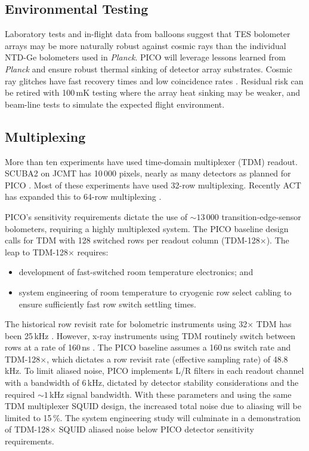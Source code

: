 
\subsection{Environmental Testing}
\label{sec:env_testing}

Laboratory tests and in-flight data from balloons suggest that TES
bolometer arrays may be more naturally robust against cosmic rays than
the individual NTD-Ge bolometers used in \textit{Planck}. PICO will leverage lessons
learned from \textit{Planck} and ensure robust thermal sinking of
detector array substrates. Cosmic ray
glitches have fast recovery times and low coincidence rates
\citep{SPIDER2018,Filippini_inprep}. Residual risk can be retired with 100\,mK
testing where the array heat sinking may be weaker, and beam-line
tests to simulate the expected flight environment.

\subsection{Multiplexing}
\label{sec:multiplexing}

More than ten experiments have used time-domain multiplexer (TDM)
readout. SCUBA2 on JCMT has 10\,000 pixels, nearly as many detectors
as planned for PICO \citep{Holland2013}. Most of these experiments
have used 32-row multiplexing. Recently ACT has expanded this to
64-row multiplexing \citep{Henderson2016}.

PICO's sensitivity requirements dictate the use of $\sim 13\,000$
transition-edge-sensor bolometers, requiring a highly multiplexed
system.  The PICO baseline design calls for TDM
with 128 switched rows per readout column (TDM-128$\times$). The leap
to TDM-128$\times$ requires:
\begin{itemize}
\item development of fast-switched room temperature electronics; and
\item system engineering of room temperature to cryogenic row select cabling to ensure sufficiently fast row switch settling times.
\end{itemize}

The historical row revisit rate for bolometric instruments using
32$\times$ TDM has been 25\,kHz \cite[e.g.,][]{BICEP2015}. However,
x-ray instruments using TDM routinely switch between rows at a rate of
160\,ns \citep{Doriese2016}. The PICO baseline assumes a 160\,ns
switch rate and TDM-128$\times$, which dictates a row revisit rate
(effective sampling rate) of 48.8\,kHz. To limit aliased noise, PICO
implements L/R filters in each readout channel with a bandwidth of
6\,kHz, dictated by detector stability considerations and the required
$\sim1$\,kHz signal bandwidth.  With these parameters and using the
same TDM multiplexer SQUID design, the increased total noise due to
aliasing will be limited to 15\,\%.  The system engineering study will
culminate in a demonstration of TDM-128$\times$ SQUID aliased noise
below PICO detector sensitivity requirements.


